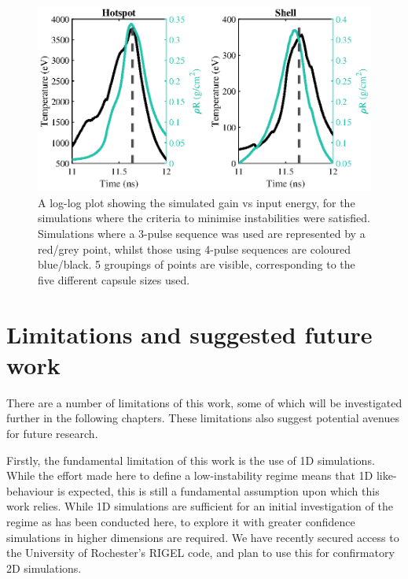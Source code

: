 \begin{figure}[ht]
\centering
\includegraphics{figures/LowCR/RhoRandT.eps}
\caption{A log-log plot showing the simulated gain vs input energy, for the simulations where the criteria to minimise instabilities were satisfied. Simulations where a 3-pulse sequence was used are represented by a red/grey point, whilst those using 4-pulse sequences are coloured blue/black. 5 groupings of points are visible, corresponding to the five different capsule sizes used.}
\label{fig:HSandShellLMJ}
\end{figure}


\section{Limitations and suggested future work}
There are a number of limitations of this work, some of which will be investigated further in the following chapters. These limitations also suggest potential avenues for future research.

Firstly, the fundamental limitation of this work is the use of 1D simulations. While the effort made here to define a low-instability regime means that 1D like-behaviour is expected, this is still a fundamental assumption upon which this work relies. While 1D simulations are sufficient for an initial investigation of the regime as has been conducted here, to explore it with greater confidence simulations in higher dimensions are required. We have recently secured access to the University of Rochester's RIGEL code, and plan to use this for confirmatory 2D simulations.

